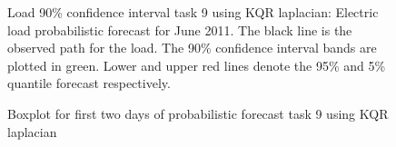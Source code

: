 \begin{figure}[!ht]
    \centering
    \caption[Prediction load track task 9, Laplacian kernel]{Load 90\% confidence interval task 9 using KQR laplacian: \small \textmd{Electric load probabilistic forecast for June 2011. The black line is the observed path for the load. The 90\% confidence interval bands are plotted in green. Lower and upper red lines denote the 95\% and 5\% quantile forecast respectively.}}
    \label{fig:load_task_9}
\end{figure}


\begin{figure}[!ht]
    \centering
    \caption{Boxplot for first two days of probabilistic forecast task 9 using KQR laplacian}
    \label{fig:load_task_9}
\end{figure}




